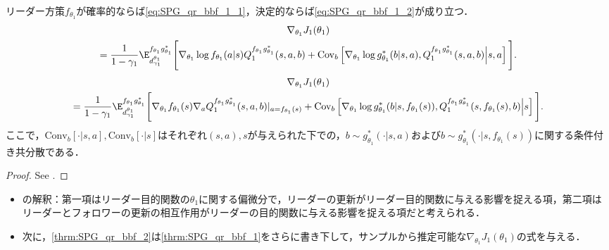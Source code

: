 \documentclass[a4paper,10pt,dvipdfmx]{jsarticle}
\begin{document}
\begin{theorem}\label{thrm:SPG_qr_bbf_1}
    リーダー方策$f_{\theta_1}$が確率的ならば\cref{eq:SPG_qr_bbf_1_1}，決定的ならば\cref{eq:SPG_qr_bbf_1_2}が成り立つ．
    \begin{multline}
        \nabla_{\theta_1}J_1(\theta_1)\\
        =\dfrac{1}{1-\gamma_1}\E_{d_{\gamma_1}^{\theta_1}}^{f_{\theta_1}g_{\theta_1}^*}\Bigg[\nabla_{\theta_1}\log f_{\theta_1}(a|s)Q_1^{f_{\theta_1}g_{\theta_1}^*}(s,a,b)
        +\mathrm{Cov}_{b}\left[\nabla_{\theta_1}\log g_{\theta_1}^*(b|s,a),Q_1^{f_{\theta_1}g_{\theta_1}^*}(s,a,b)\middle|s,a\right]\Bigg].\label{eq:SPG_qr_bbf_1_1}
    \end{multline}
    \begin{multline}
        \nabla_{\theta_1}J_1(\theta_1)\\
        =\dfrac{1}{1-\gamma_1}\E_{d_{\gamma_1}^{\theta_1}}^{f_{\theta_1}g_{\theta_1}^*}\Bigg[\nabla_{\theta_1}f_{\theta_1}(s)\nabla_{a}Q_1^{f_{\theta_1}g_{\theta_1}^*}(s,a,b)|_{a=f_{\theta_1}(s)}
        +\mathrm{Cov}_{b}\left[\nabla_{\theta_1}\log g_{\theta_1}^*(b|s,f_{\theta_1}(s)),Q_1^{f_{\theta_1}g_{\theta_1}^*}(s,f_{\theta_1}(s),b)\middle|s\right]\Bigg].\label{eq:SPG_qr_bbf_1_2}
    \end{multline}
    ここで，$\mathrm{Conv}_{b}[\cdot|s,a],\mathrm{Conv}_{b}[\cdot|s]$はそれぞれ$(s,a),s$が与えられた下での，$b\sim g_{\theta_1}^*(\cdot|s,a)$および$b\sim g_{\theta_1}^*(\cdot|s,f_{\theta_1}(s))$に関する条件付き共分散である．
\end{theorem}
\begin{proof}
    See .
\end{proof}

\begin{itemize}
    \item {}の解釈：第一項はリーダー目的関数の$\theta_1$に関する偏微分で，リーダーの更新がリーダー目的関数に与える影響を捉える項，第二項はリーダーとフォロワーの更新の相互作用がリーダーの目的関数に与える影響を捉える項だと考えられる．
    \item 次に，\cref{thrm:SPG_qr_bbf_2}は\cref{thrm:SPG_qr_bbf_1}をさらに書き下して，サンプルから推定可能な$\nabla_{\theta_1}J_1(\theta_1)$の式を与える．
\end{itemize}
\end{document}
